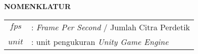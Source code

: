 \begin{center}
	\Large\textbf{NOMENKLATUR}
\end{center}
\vspace{1ex}

\begin{tabular}{c m{30em}}
	$fps$	& : \textit{Frame Per Second} / Jumlah Citra Perdetik\\
	$unit$	& : unit pengukuran \textit{Unity Game Engine} \\
	
	
\end{tabular}
\vspace{1ex}